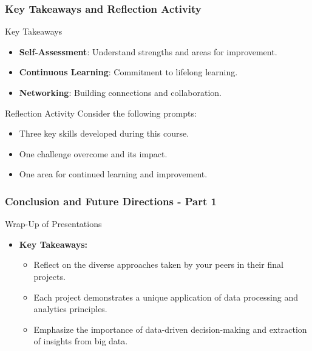 \documentclass[aspectratio=169]{beamer}
\begin{document}
\begin{frame}[fragile]
    \frametitle{Key Takeaways and Reflection Activity}
    \begin{block}{Key Takeaways}
        \begin{itemize}
            \item \textbf{Self-Assessment}: Understand strengths and areas for improvement.
            \item \textbf{Continuous Learning}: Commitment to lifelong learning.
            \item \textbf{Networking}: Building connections and collaboration.
        \end{itemize}
    \end{block}
    
    \begin{block}{Reflection Activity}
        Consider the following prompts:
        \begin{itemize}
            \item Three key skills developed during this course.
            \item One challenge overcome and its impact.
            \item One area for continued learning and improvement.
        \end{itemize}
    \end{block}
\end{frame}

\begin{frame}[fragile]
    \frametitle{Conclusion and Future Directions - Part 1}
    \begin{block}{Wrap-Up of Presentations}
        \begin{itemize}
            \item \textbf{Key Takeaways:}
            \begin{itemize}
                \item Reflect on the diverse approaches taken by your peers in their final projects.
                \item Each project demonstrates a unique application of data processing and analytics principles.
                \item Emphasize the importance of data-driven decision-making and extraction of insights from big data.
            \end{itemize}
        \end{itemize}
    \end{block}
\end{frame}
\end{document}
